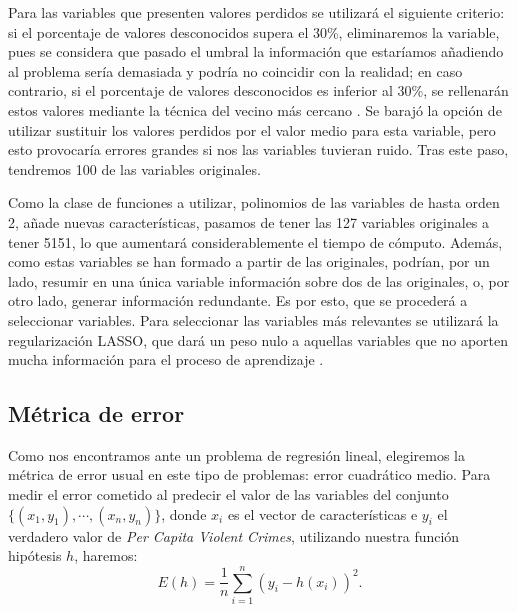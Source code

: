 \documentclass[a4paper, 20pt]{article}
\begin{document}
Para las variables que presenten valores perdidos se utilizará el siguiente criterio: si el porcentaje de valores desconocidos supera el 30\%, eliminaremos la variable, pues se considera que pasado el umbral la información que estaríamos añadiendo al problema sería demasiada y podría no coincidir con la realidad; en caso contrario, si el porcentaje de valores desconocidos es inferior al 30\%, se rellenarán estos valores mediante la técnica del vecino más cercano \cite{knnimputer}. Se barajó la opción de utilizar sustituir los valores perdidos por el valor medio para esta variable, pero esto provocaría errores grandes si nos las variables tuvieran ruido. Tras este paso, tendremos 100 de las variables originales.

Como la clase de funciones a utilizar, polinomios de las variables de hasta orden 2, añade nuevas características, pasamos de tener las 127 variables originales a tener 5151, lo que aumentará considerablemente el tiempo de cómputo. Además, como estas variables se han formado a partir de las originales, podrían, por un lado, resumir en una única variable información sobre dos de las originales, o, por otro lado, generar información redundante. Es por esto, que se procederá a seleccionar variables. Para seleccionar las variables más relevantes se utilizará la regularización LASSO, que dará un peso nulo a aquellas variables que no aporten mucha información para el proceso de aprendizaje \cite{lasso}. 

\subsection{Métrica de error}
Como nos encontramos ante un problema de regresión lineal, elegiremos la métrica de error usual en este tipo de problemas: error cuadrático medio. Para medir el error cometido al predecir el valor de las variables del conjunto $\{(x_1,y_1),\cdots,(x_n,y_n)\}$, donde $x_i$ es el vector de características e $y_i$ el verdadero valor de \textit{Per Capita Violent Crimes}, utilizando nuestra función hipótesis $h$, haremos:\[
E(h) = \frac{1}{n}\sum_{i=1}^n\left(y_i-h(x_i)\right)^2.
\]
\end{document}
